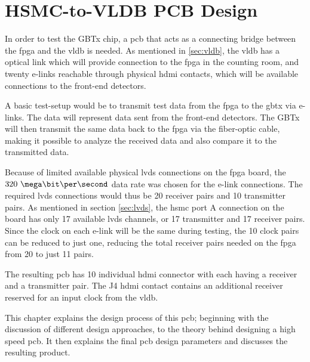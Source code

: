 \documentclass[main.tex]{subfiles}
\begin{document}
\chapter{HSMC-to-VLDB PCB Design} \label{chap:pcb}

In order to test the GBTx chip, a \gls{pcb} that acts as a connecting bridge between the \gls{fpga} and the \gls{vldb} is needed. As mentioned in \ref{sec:vldb}, the \gls{vldb} has a optical link which will provide connection to the \gls{fpga} in the counting room, and twenty e-links reachable through physical \acrshort{hdmi} contacts, which will be available connections to the front-end detectors.

A basic test-setup would be to transmit test data from the \gls{fpga} to the \gls{gbt}x via e-links. The data will represent data sent from the front-end detectors. The GBTx will then transmit the same data back to the \gls{fpga} via the fiber-optic cable, making it possible to analyze the received data and also compare it to the transmitted data.


Because of limited available physical \gls{lvds} connections on the \gls{fpga} board, the $320~\mega\bit\per\second$ data rate was chosen for the e-link connections. The required \gls{lvds} connections would thus be 20 receiver pairs and 10 transmitter pairs. As mentioned in section \ref{sec:lvds}, the \gls{hsmc} port A connection on the board has only 17 available \gls{lvds} channels, or 17 transmitter and 17 receiver pairs. Since the clock on each e-link will be the same during testing, the 10 clock pairs can be reduced to just one, reducing the total receiver pairs needed on the \gls{fpga} from 20 to just 11 pairs.  

The resulting \acrshort{pcb} has 10 individual \gls{hdmi} connector with each having a receiver and a transmitter pair. The J4 \gls{hdmi} contact contains an additional receiver reserved for an input clock from the \gls{vldb}. 

This chapter explains the design process of this \acrshort{pcb}; beginning with the discussion of different design approaches, to the theory behind designing a high speed \acrshort{pcb}. It then explains the final \acrshort{pcb} design parameters and discusses the resulting product.\\
\end{document}
